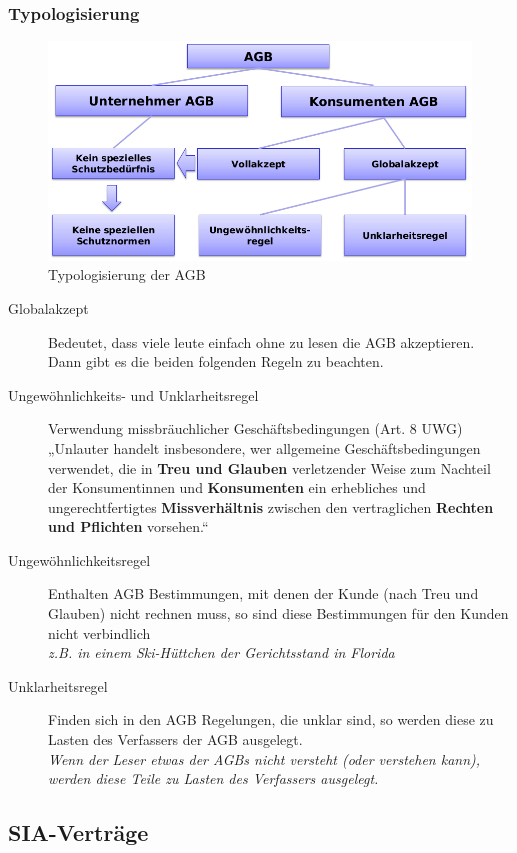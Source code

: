 \subsubsection{Typologisierung}
\begin{figure}[H]
\centering
\includegraphics[width=.9\textwidth]{figures/typolisierungAGB.png}
\caption{Typologisierung der AGB}
\end{figure}

\begin{description}
	\item[Globalakzept] Bedeutet, dass viele leute einfach ohne zu lesen
	die AGB akzeptieren. Dann gibt es die beiden folgenden Regeln zu
	beachten.
	\item[Ungewöhnlichkeits- und Unklarheitsregel]
	Verwendung missbräuchlicher Geschäftsbedingungen (Art. 8 UWG) „Unlauter
	handelt insbesondere, wer allgemeine Geschäftsbedingungen verwendet, die
	in \textbf{Treu und Glauben} verletzender Weise zum Nachteil der
	Konsumentinnen und \textbf{Konsumenten} ein erhebliches und
	ungerechtfertigtes \textbf{Missverhältnis} zwischen den vertraglichen
	\textbf{Rechten und Pflichten} vorsehen.``
	\item[Ungewöhnlichkeitsregel]  Enthalten AGB Bestimmungen, mit denen
	der Kunde (nach Treu und Glauben) nicht rechnen muss, so sind diese
	Bestimmungen für den Kunden nicht verbindlich\\
	\emph{z.B. in einem Ski-Hüttchen der Gerichtsstand in Florida}
	\item[Unklarheitsregel] Finden sich in den AGB Regelungen, die unklar
	sind, so werden diese zu Lasten des Verfassers der AGB ausgelegt.\\
	\emph{Wenn der Leser etwas der AGBs nicht versteht (oder verstehen
	kann), werden diese Teile zu Lasten des Verfassers ausgelegt.}
\end{description}


\subsection{SIA-Verträge}

